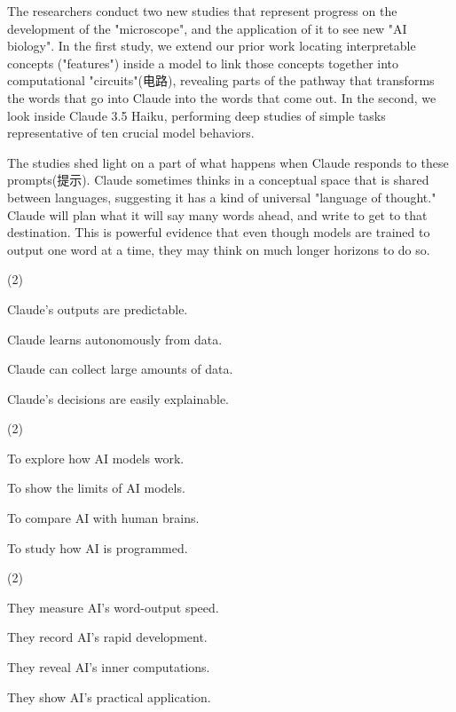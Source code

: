\documentclass{英语试卷}
\begin{document}
\par The researchers conduct two new studies that represent progress on the development of the "microscope", and the application of it to see new "AI biology". In the first study, we extend our prior work locating interpretable concepts ("features") inside a model to link those concepts together into computational "circuits"(电路), revealing parts of the pathway that transforms the words that go into Claude into the words that come out. In the second, we look inside Claude 3.5 Haiku, performing deep studies of simple tasks representative of ten crucial model behaviors.\par
\par The studies shed light on a part of what happens when Claude responds to these prompts(提示). Claude sometimes thinks in a conceptual space that is shared between languages, suggesting it has a kind of universal "language of thought." Claude will plan what it will say many words ahead, and write to get to that destination. This is powerful evidence that even though models are trained to output one word at a time, they may think on much longer horizons to do so.\par
{}
\begin{choices}(2)
  \item Claude's outputs are predictable.
  \item Claude learns autonomously from data.
  \item Claude can collect large amounts of data.
  \item Claude's decisions are easily explainable.
\end{choices}
\begin{choices}(2)
  \item To explore how AI models work.
  \item To show the limits of AI models.
  \item To compare AI with human brains.
  \item To study how AI is programmed.
\end{choices}
\begin{choices}(2)
  \item They measure AI's word-output speed.
  \item They record AI's rapid development.
  \item They reveal AI's inner computations.
  \item They show AI's practical application.
\end{choices}
\end{document}

